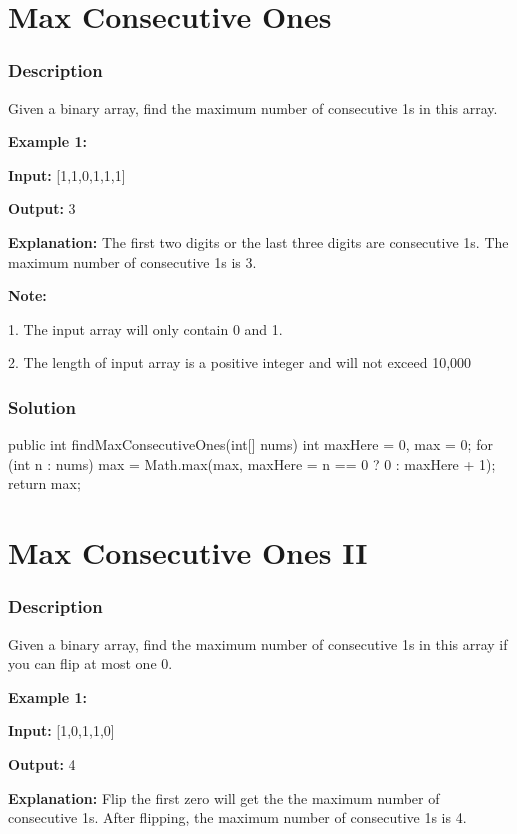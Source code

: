 \newpage

\section{Max Consecutive Ones} %

\subsubsection{Description}
Given a binary array, find the maximum number of consecutive 1s in this array.

\textbf{Example 1:}

\textbf{Input:} [1,1,0,1,1,1]

\textbf{Output:} 3

\textbf{Explanation:} The first two digits or the last three digits are consecutive 1s.
    The maximum number of consecutive 1s is 3.

\textbf{Note:}

1. The input array will only contain 0 and 1.

2. The length of input array is a positive integer and will not exceed 10,000
\subsubsection{Solution}

\begin{Code}
public int findMaxConsecutiveOnes(int[] nums) {
    int maxHere = 0, max = 0;
    for (int n : nums)
        max = Math.max(max, maxHere = n == 0 ? 0 : maxHere + 1);
    return max;
}
\end{Code}

\newpage

\section{Max Consecutive Ones II} %

\subsubsection{Description}
Given a binary array, find the maximum number of consecutive 1s in this array if you can flip at most one 0.

\textbf{Example 1:}

\textbf{Input:} [1,0,1,1,0]

\textbf{Output:} 4

\textbf{Explanation:} Flip the first zero will get the the maximum number of consecutive 1s.
    After flipping, the maximum number of consecutive 1s is 4.


